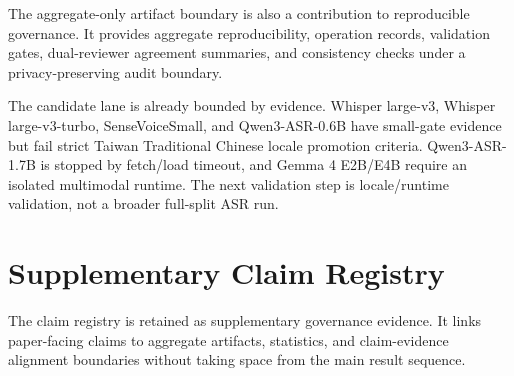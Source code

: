 \documentclass[
]{article}
\begin{document}
The aggregate-only artifact boundary is also a contribution to
reproducible governance. It provides aggregate reproducibility,
operation records, validation gates, dual-reviewer agreement summaries,
and consistency checks under a privacy-preserving audit boundary.

The candidate lane is already bounded by evidence. Whisper large-v3,
Whisper large-v3-turbo, SenseVoiceSmall, and Qwen3-ASR-0.6B have
small-gate evidence but fail strict Taiwan Traditional Chinese locale
promotion criteria. Qwen3-ASR-1.7B is stopped by fetch/load timeout, and
Gemma 4 E2B/E4B require an isolated multimodal runtime. The next
validation step is locale/runtime validation, not a broader full-split
ASR run.

\hypertarget{claim-registry}{%
\section{Supplementary Claim Registry}\label{claim-registry}}

The claim registry is retained as supplementary governance evidence. It
links paper-facing claims to aggregate artifacts, statistics, and
claim-evidence alignment boundaries without taking space from the main
result sequence.
\end{document}
